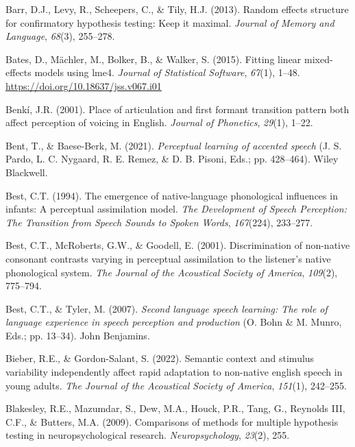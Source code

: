 \documentclass[
  12pt,
  twoside]{article}
\newlength{\cslhangindent}
\newlength{\cslentryspacingunit} %
\newenvironment{CSLReferences}[2] %
 {%
  \setlength{\parindent}{0pt}
  \ifodd #1
  \let\oldpar\par
  \def\par{\hangindent=\cslhangindent\oldpar}
  \fi
  \setlength{\parskip}{#2\cslentryspacingunit}
 }%
 {}
\begin{document}
\begin{CSLReferences}{1}{0}
\leavevmode{}%
Barr, D.J., Levy, R., Scheepers, C., \& Tily, H.J. (2013). Random effects structure for confirmatory hypothesis testing: Keep it maximal. \emph{Journal of Memory and Language}, \emph{68}(3), 255--278.

\leavevmode{}%
Bates, D., Mächler, M., Bolker, B., \& Walker, S. (2015). Fitting linear mixed-effects models using {lme4}. \emph{Journal of Statistical Software}, \emph{67}(1), 1--48. \url{https://doi.org/10.18637/jss.v067.i01}

\leavevmode{}%
Benkí, J.R. (2001). Place of articulation and first formant transition pattern both affect perception of voicing in {English}. \emph{Journal of Phonetics}, \emph{29}(1), 1--22.

\leavevmode{}%
Bent, T., \& Baese-Berk, M. (2021). \emph{Perceptual learning of accented speech} (J. S. Pardo, L. C. Nygaard, R. E. Remez, \& D. B. Pisoni, Eds.; pp. 428--464). Wiley Blackwell.

\leavevmode{}%
Best, C.T. (1994). The emergence of native-language phonological influences in infants: A perceptual assimilation model. \emph{The Development of Speech Perception: The Transition from Speech Sounds to Spoken Words}, \emph{167}(224), 233--277.

\leavevmode{}%
Best, C.T., McRoberts, G.W., \& Goodell, E. (2001). Discrimination of non-native consonant contrasts varying in perceptual assimilation to the listener's native phonological system. \emph{The Journal of the Acoustical Society of America}, \emph{109}(2), 775--794.

\leavevmode{}%
Best, C.T., \& Tyler, M. (2007). \emph{Second language speech learning: The role of language experience in speech perception and production} (O. Bohn \& M. Munro, Eds.; pp. 13--34). John Benjamins.

\leavevmode{}%
Bieber, R.E., \& Gordon-Salant, S. (2022). Semantic context and stimulus variability independently affect rapid adaptation to non-native english speech in young adults. \emph{The Journal of the Acoustical Society of America}, \emph{151}(1), 242--255.

\leavevmode{}%
Blakesley, R.E., Mazumdar, S., Dew, M.A., Houck, P.R., Tang, G., Reynolds III, C.F., \& Butters, M.A. (2009). Comparisons of methods for multiple hypothesis testing in neuropsychological research. \emph{Neuropsychology}, \emph{23}(2), 255.


\end{CSLReferences}
\end{document}
